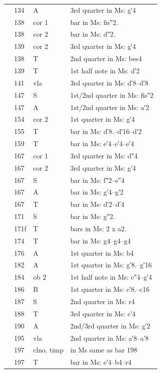 \documentclass[parskip=full]{scrreprt}
\begin{document}
\begin{longtable}{lll L{10cm}}
	  & 134  & A       & 3rd quarter in Ms: g′4 \\
	  & 138  & cor 1   & bar in Ms: fis″2. \\
	  & 138  & cor 2   & bar in Ms: d″2. \\
	  & 139  & cor 2    &3rd quarter in Ms: g′4 \\
	  & 138  & T       & 2nd quarter in Ms: bes4 \\
	  & 139  & T       & 1st half note in Ms: d′2 \\
	  & 141  & vla     & 3rd quarter in Ms: d′8–d′8 \\
	  & 147  & S       & 1st/2nd quarter in Ms: fis″2 \\
	  & 147  & A       & 1st/2nd quarter in Ms: a′2 \\
	  & 154  & cor 2   & 1st quarter in Ms: g′4 \\  
	  & 155  & T       & bar in Ms: d′8.–d′16–d′2 \\
	  & 159  & T       & bar in Ms: e′4–e′4–e′4 \\
	  & 167  & cor 1   & 3rd quarter in Ms: d″4 \\
	  & 167  & cor 2   & 3rd quarter in Ms: g′4 \\
	  & 167  & S       & bar in Ms: f″2–e″4 \\
	  & 167  & A       & bar in Ms: g′4–g′2 \\
	  & 167  & T       & bar in Ms: d′2–d′4 \\
	  & 171  & S       & bar in Ms: g″2. \\
	  & 171f & T       & bars in Ms: 2 x a2. \\
	  & 174  & T       & bar in Ms: g4–g4–g4 \\
	  & 176  & A       & 1st quarter in Ms: b4 \\
	  & 182  & A       & 1st quarter in Ms: g′8.–g′16 \\
	  & 184  & ob 2    & 1st half note in Ms: c″4–g′4 \\
	  & 186  & B       & 1st quarter in Ms: c′8.–c16 \\
	  & 187  & S       & 2nd quarter in Ms: r4 \\
	  & 188  & T       & 3rd quarter in Ms: c′4 \\
	  & 190  & A       & 2nd/3rd quarter in Ms: g′2 \\
	  & 195  & vla     & 2nd quarter in Ms: a′8–a′8 \\
	  & 197  & clno, timp & in Ms same as bar 198 \\
	  & 197  & T       & bar in Ms: e′4–b4–r4 \\

\end{longtable}
\end{document}
